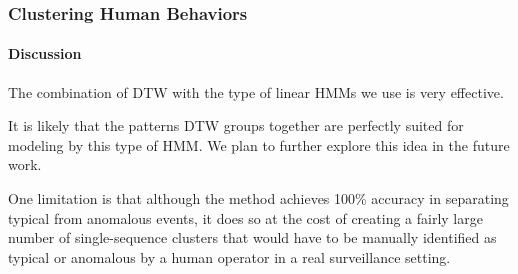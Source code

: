 
\begin{frame}
    \frametitle{Clustering Human Behaviors}
    \framesubtitle{Discussion}

    The combination of DTW with the type of linear HMMs we 
    use is very effective. 
    
    \bigskip
    
    It is likely that the patterns DTW groups together are 
    perfectly suited for modeling by this type of HMM. We 
    plan to further explore this idea in the future work.

    \bigskip 

    One limitation is that although the method achieves 100\% accuracy 
    in separating typical from anomalous events, it does so at the cost 
    of creating a fairly large number of single-sequence clusters that 
    would have to be manually identified as typical or anomalous by a 
    human operator in a real surveillance setting.

\end{frame}

\fi

